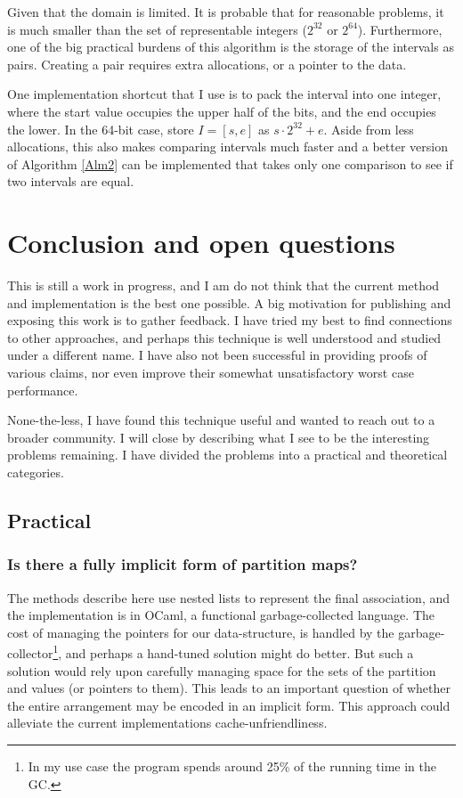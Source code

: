 \documentclass{article}
\begin{document}
Given that the domain is limited.
It is probable that for reasonable problems,
it is much smaller than the set of representable integers ($2^{32}$ or $2^{64}$).
Furthermore,
one of the big practical burdens of this algorithm is the storage of the intervals
as pairs.
Creating a pair requires extra allocations, or a pointer to the data.

One implementation shortcut that I use is to pack the interval into one integer,
where the start value occupies the upper half of the bits,
and the end occupies the lower.
In the 64-bit case, store $I = [s,e]$ as  $s \cdot 2^{32}+e$.
Aside from less allocations,
this also makes comparing intervals much faster
and a better version of Algorithm \ref{Alm2} can be implemented that
takes only one comparison to see if two intervals are equal.

\section{Conclusion and open questions}

This is still a work in progress,
and I am do not think that the current method and implementation is the best
one possible.
A big motivation for publishing and exposing this work is to gather feedback.
I have tried my best to find connections to other approaches,
and perhaps this technique is well understood and studied under a different name.
I have also not been successful in providing proofs of various claims,
nor even improve their somewhat unsatisfactory worst case
performance.%

None-the-less, I have found this technique useful and wanted to reach out to a
broader community.
I will close by describing what I see to be the interesting problems remaining.
I have divided the problems into a practical and theoretical categories.

\subsection{Practical}
\subsubsection{Is there a fully implicit form of partition maps?}

The methods describe here use nested lists to represent the final association,
and the implementation is in OCaml,
a functional garbage-collected language.
The cost of managing the pointers for our data-structure,
is handled by the garbage-collector\footnote{
  In my use case the program spends around 25\% of the running time in the GC.},
and perhaps a hand-tuned solution might do better.
But such a solution would rely upon carefully managing space for
the sets of the partition and values (or pointers to them).
This leads to an important question of whether the entire arrangement may be
encoded in an implicit form.
This approach could alleviate the current implementations cache-unfriendliness.
\end{document}
